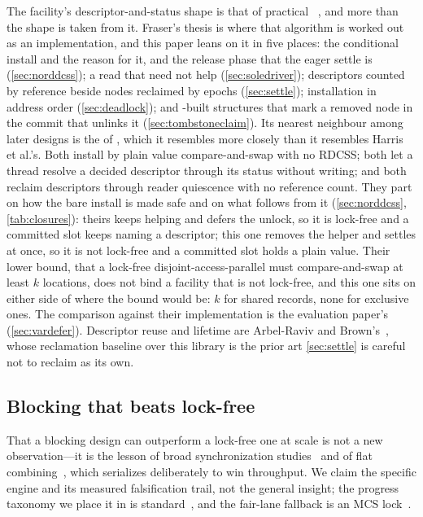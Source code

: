 \documentclass[11pt]{article}
\begin{document}
The facility's descriptor-and-status shape
is that of practical \mcas~\citep{harris2002mcas, fraser2004lockfreedom,
fraser2007locks}, and more than the shape is taken from it. Fraser's thesis is
where that algorithm is worked out as an implementation, and this paper leans on
it in five places: the conditional install and the reason for it, and the
release phase that the eager settle is (\cref{sec:norddcss}); a read that need
not help (\cref{sec:soledriver}); descriptors counted by reference beside nodes
reclaimed by epochs (\cref{sec:settle}); installation in address order
(\cref{sec:deadlock}); and \mcas-built structures that mark a removed node in
the commit that unlinks it (\cref{sec:tombstoneclaim}). Its nearest neighbour
among later designs is the \kcas of
\citet{guerraoui2020mcas}, which it resembles more closely than it resembles
Harris et al.'s. Both install by plain value compare-and-swap with no RDCSS;
both let a thread resolve a decided descriptor through its status without
writing; and both reclaim descriptors through reader quiescence with no
reference count. They part on how the bare install is made safe and on what
follows from it (\cref{sec:norddcss}, \cref{tab:closures}): theirs keeps helping
and defers the unlock, so it is lock-free and a committed slot keeps naming a
descriptor; this one removes the helper and settles at once, so it is not
lock-free and a committed slot holds a plain value. Their lower bound, that a
lock-free disjoint-access-parallel \kcas must compare-and-swap at least $k$
locations, does not bind a facility that is not lock-free, and this one sits
on either side of where the bound would be: $k$ for shared records, none for
exclusive ones. The comparison against their implementation is the evaluation
paper's (\cref{sec:vardefer}). Descriptor reuse and lifetime are Arbel-Raviv and
Brown's~\citep{arbelraviv2017descriptors}, whose \rcu reclamation baseline over
this library is the prior art \cref{sec:settle} is careful not to reclaim as its
own.

\subsection{Blocking that beats lock-free}

That a blocking design can outperform
a lock-free one at scale is not a new observation---it is the lesson of broad
synchronization studies~\citep{david2013everything} and of flat
combining~\citep{hendler2010flatcombining}, which serializes deliberately to win
throughput. We claim the specific engine and its measured falsification trail, not
the general insight; the progress taxonomy we place it in is
standard~\citep{herlihy2003obstruction, herlihy2011progress}, and the fair-lane
fallback is an MCS lock~\citep{mellorcrummey1991mcs}.
\end{document}
